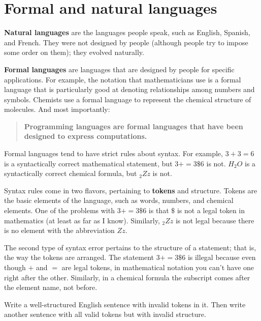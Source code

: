 \documentclass[10pt]{book}
\begin{document}
\section{Formal and natural languages}

{\bf Natural languages} are the languages people speak, such as English, Spanish, and French.  They were not designed by people (although people try to impose some order on them); they evolved naturally.

{\bf Formal languages} are languages that are designed by people for specific applications.  For example, the notation that mathematicians use is a formal language that is particularly good at denoting relationships among numbers and symbols.  Chemists use a formal language to represent the chemical structure of molecules.  And most importantly:

\begin{quote}
{\bf Programming languages are formal languages that have been designed to express computations.}
\end{quote}

Formal languages tend to have strict rules about syntax.  For example, $3 + 3 = 6$ is a syntactically correct mathematical statement, but $3 + = 3 \mbox{\$} 6$ is not.  $H_2O$ is a syntactically correct chemical formula, but $_2Zz$ is not.

Syntax rules come in two flavors, pertaining to {\bf tokens} and structure.  Tokens are the basic elements of the language, such as words, numbers, and chemical elements.  One of the problems with $3 + = 3 \mbox{\$} 6$ is that $\$$ is not a legal token in mathematics (at least as far as I know).  Similarly, $_2Zz$ is not legal because there is no element with the abbreviation $Zz$.


The second type of syntax error pertains to the structure of a statement; that is, the way the tokens are arranged.  The statement $3 + = 3 \mbox{\$} 6$ is illegal because even though $+$ and $=$ are legal tokens, in mathematical notation you can't have one right after the other.  Similarly, in a chemical formula the subscript comes after the element name, not before.

\begin{ex}
Write a well-structured English sentence with invalid tokens in it.  Then write another sentence with all valid tokens but with invalid structure.
\end{ex}
\end{document}
